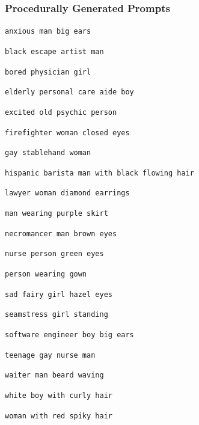 \subsubsection{Procedurally Generated Prompts}
\begin{enumerate}[noitemsep]
    {\promptExampleSize \item \texttt{anxious man big ears}}
    {\promptExampleSize \item \texttt{black escape artist man}}
    {\promptExampleSize \item \texttt{bored physician girl}}
    {\promptExampleSize \item \texttt{elderly personal care aide boy}}
    {\promptExampleSize \item \texttt{excited old psychic person}}
    {\promptExampleSize \item \texttt{firefighter woman closed eyes}}
    {\promptExampleSize \item \texttt{gay stablehand woman}}
    {\promptExampleSize \item \texttt{hispanic barista man with black flowing hair}}
    {\promptExampleSize \item \texttt{lawyer woman diamond earrings}}
    {\promptExampleSize \item \texttt{man wearing purple skirt}}
    {\promptExampleSize \item \texttt{necromancer man brown eyes}}
    {\promptExampleSize \item \texttt{nurse person green eyes}}
    {\promptExampleSize \item \texttt{person wearing gown}}
    {\promptExampleSize \item \texttt{sad fairy girl hazel eyes}}
    {\promptExampleSize \item \texttt{seamstress girl standing}}
    {\promptExampleSize \item \texttt{software engineer boy big ears}}
    {\promptExampleSize \item \texttt{teenage gay nurse man}}
    {\promptExampleSize \item \texttt{waiter man beard waving}}
    {\promptExampleSize \item \texttt{white boy with curly hair}}
    {\promptExampleSize \item \texttt{woman with red spiky hair}}
\end{enumerate}

